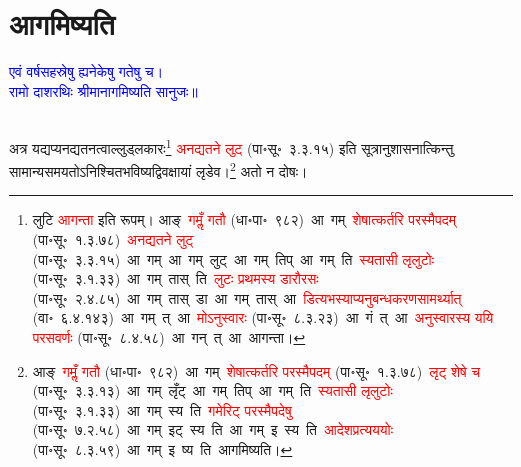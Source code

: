 \section[आगमिष्यति]{आगमिष्यति}
\centering\textcolor{blue}{एवं वर्षसहस्रेषु ह्यनेकेषु गतेषु च।\nopagebreak\\
रामो दाशरथिः श्रीमानागमिष्यति सानुजः॥}\nopagebreak\\
\\
\fontsize{14}{21}\selectfont\begin{sloppypar}\justifying\noindent\hspace{10mm} अत्र यद्यप्यनद्य\-तनत्वाल्लुड्लकारः\footnote{लुटि \textcolor{red}{आगन्ता} इति रूपम्। आङ्~\textcolor{red}{गमॢँ गतौ} (धा॰पा॰~९८२)~\arrow आ~गम्~\arrow \textcolor{red}{शेषात्कर्तरि परस्मैपदम्} (पा॰सू॰~१.३.७८)~\arrow \textcolor{red}{अनद्यतने लुट्} (पा॰सू॰~३.३.१५)~\arrow आ~गम्~\arrow आ~गम्~लुट्~\arrow आ~गम्~तिप्~\arrow आ~गम्~ति~\arrow \textcolor{red}{स्यतासी लृलुटोः} (पा॰सू॰~३.१.३३)~\arrow आ~गम्~तास्~ति~\arrow \textcolor{red}{लुटः प्रथमस्य डारौरसः} (पा॰सू॰~२.४.८५)~\arrow आ~गम्~तास्~डा~\arrow आ~गम्~तास्~आ~\arrow \textcolor{red}{डित्यभस्याप्यनु\-बन्धकरण\-सामर्थ्यात्} (वा॰~६.४.१४३)~\arrow आ~गम्~त्~आ~\arrow \textcolor{red}{मोऽनुस्वारः} (पा॰सू॰~८.३.२३)~\arrow आ~गं~त्~आ~\arrow \textcolor{red}{अनुस्वारस्य ययि परसवर्णः} (पा॰सू॰~८.४.५८)~\arrow आ~गन्~त्~आ~\arrow आगन्ता।} \textcolor{red}{अनद्यतने लुट्} (पा॰सू॰~३.३.१५) इति सूत्रानुशासनात्किन्तु
सामान्य\-समयतोऽनिश्चित\-भविष्यद्विवक्षायां
लृडेव।\footnote{आङ्~\textcolor{red}{गमॢँ गतौ} (धा॰पा॰~९८२)~\arrow आ~गम्~\arrow \textcolor{red}{शेषात्कर्तरि परस्मैपदम्} (पा॰सू॰~१.३.७८)~\arrow \textcolor{red}{लृट् शेषे च} (पा॰सू॰~३.३.१३)~\arrow आ~गम्~लृँट्~\arrow आ~गम्~तिप्~\arrow आ~गम्~ति~\arrow \textcolor{red}{स्यतासी लृलुटोः} (पा॰सू॰~३.१.३३)~\arrow आ~गम्~स्य~ति~\arrow \textcolor{red}{गमेरिट् परस्मैपदेषु} (पा॰सू॰~७.२.५८)~\arrow आ~गम्~इट्~स्य~ति~\arrow आ~गम्~इ~स्य~ति~\arrow \textcolor{red}{आदेशप्रत्यययोः} (पा॰सू॰~८.३.५९)~\arrow आ~गम्~इ~ष्य~ति~\arrow आगमिष्यति।} अतो न दोषः।\end{sloppypar}
